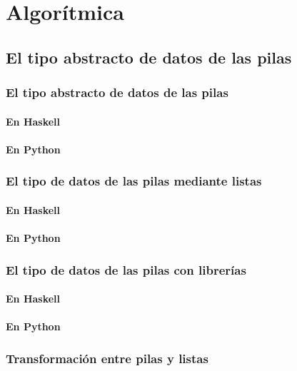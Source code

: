 \documentclass[a4paper,12pt,twoside]{book}
\begin{document}
\part{Algorítmica}

\chapter{El tipo abstracto de datos de las pilas}

\minitoc

\section{El tipo abstracto de datos de las pilas}
\subsection{En Haskell}
\subsection{En Python}

\section{El tipo de datos de las pilas mediante listas}
\subsection{En Haskell}
\subsection{En Python}

\section{El tipo de datos de las pilas con librerías}
\subsection{En Haskell}
\subsection{En Python}

\section{Transformación entre pilas y listas}
\end{document}
